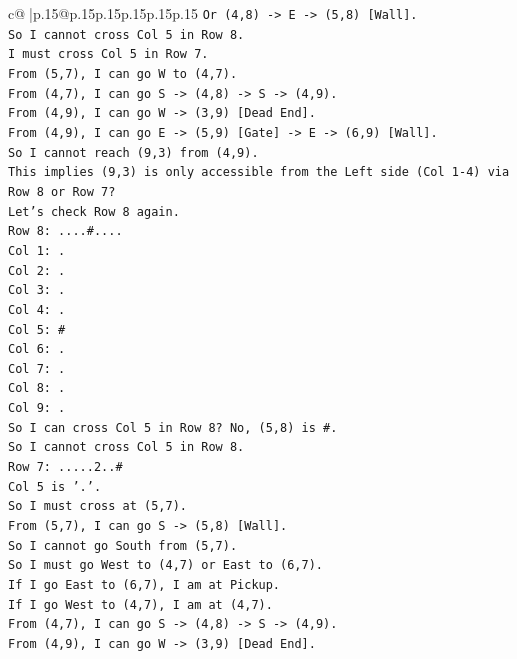 \documentclass{article}
\begin{document}
{\begin{supertabular}{c@{$\;$}|p{.15\linewidth}@{}p{.15\linewidth}p{.15\linewidth}p{.15\linewidth}p{.15\linewidth}p{.15\linewidth}}
{{{\texttt{Or (4,8) {-}> E {-}> (5,8) {[}Wall{]}.} \\
\texttt{So I cannot cross Col 5 in Row 8.} \\
\texttt{I must cross Col 5 in Row 7.} \\
\texttt{From (5,7), I can go W to (4,7).} \\
\texttt{From (4,7), I can go S {-}> (4,8) {-}> S {-}> (4,9).} \\
\texttt{From (4,9), I can go W {-}> (3,9) {[}Dead End{]}.} \\
\texttt{From (4,9), I can go E {-}> (5,9) {[}Gate{]} {-}> E {-}> (6,9) {[}Wall{]}.} \\
\texttt{So I cannot reach (9,3) from (4,9).} \\
\texttt{This implies (9,3) is only accessible from the Left side (Col 1{-}4) via Row 8 or Row 7?} \\
\texttt{Let's check Row 8 again.} \\
\texttt{Row 8: ....\#....} \\
\texttt{Col 1: .} \\
\texttt{Col 2: .} \\
\texttt{Col 3: .} \\
\texttt{Col 4: .} \\
\texttt{Col 5: \#} \\
\texttt{Col 6: .} \\
\texttt{Col 7: .} \\
\texttt{Col 8: .} \\
\texttt{Col 9: .} \\
\texttt{So I can cross Col 5 in Row 8? No, (5,8) is \#.} \\
\texttt{So I cannot cross Col 5 in Row 8.} \\
\texttt{Row 7: .....2..\#} \\
\texttt{Col 5 is '.'.} \\
\texttt{So I must cross at (5,7).} \\
\texttt{From (5,7), I can go S {-}> (5,8) {[}Wall{]}.} \\
\texttt{So I cannot go South from (5,7).} \\
\texttt{So I must go West to (4,7) or East to (6,7).} \\
\texttt{If I go East to (6,7), I am at Pickup.} \\
\texttt{If I go West to (4,7), I am at (4,7).} \\
\texttt{From (4,7), I can go S {-}> (4,8) {-}> S {-}> (4,9).} \\
\texttt{From (4,9), I can go W {-}> (3,9) {[}Dead End{]}.} \\
}}}
\end{supertabular}}
\end{document}
